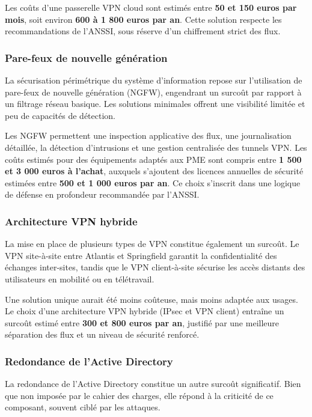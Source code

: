 \newpage

\noindent Les coûts d’une passerelle VPN cloud sont estimés entre \textbf{50 et 150 euros par mois}, soit environ \textbf{600 à 1 800 euros par an}. Cette solution respecte les recommandations de l’ANSSI, sous réserve d’un chiffrement strict des flux.

\subsubsection*{Pare-feux de nouvelle génération}

La sécurisation périmétrique du système d’information repose sur l’utilisation de pare-feux de nouvelle génération (NGFW), engendrant un surcoût par rapport à un filtrage réseau basique. Les solutions minimales offrent une visibilité limitée et peu de capacités de détection.

\noindent Les NGFW permettent une inspection applicative des flux, une journalisation détaillée, la détection d’intrusions et une gestion centralisée des tunnels VPN. Les coûts estimés pour des équipements adaptés aux PME sont compris entre \textbf{1 500 et 3 000 euros à l’achat}, auxquels s’ajoutent des licences annuelles de sécurité estimées entre \textbf{500 et 1 000 euros par an}. Ce choix s’inscrit dans une logique de défense en profondeur recommandée par l’ANSSI.

\subsubsection*{Architecture VPN hybride}

La mise en place de plusieurs types de VPN constitue également un surcoût. Le VPN site-à-site entre Atlantis et Springfield garantit la confidentialité des échanges inter-sites, tandis que le VPN client-à-site sécurise les accès distants des utilisateurs en mobilité ou en télétravail.

\noindent Une solution unique aurait été moins coûteuse, mais moins adaptée aux usages. Le choix d’une architecture VPN hybride (IPsec et VPN client) entraîne un surcoût estimé entre \textbf{300 et 800 euros par an}, justifié par une meilleure séparation des flux et un niveau de sécurité renforcé.

\subsubsection*{Redondance de l’Active Directory}

La redondance de l’Active Directory constitue un autre surcoût significatif. Bien que non imposée par le cahier des charges, elle répond à la criticité de ce composant, souvent ciblé par les attaques.

